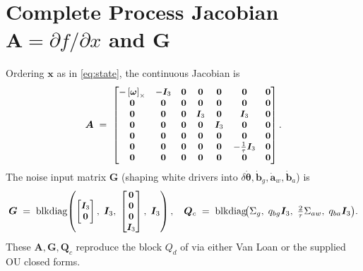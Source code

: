 \documentclass[11pt]{article}
\newcommand{\vect}[1]{\bm{#1}}
\newcommand{\mat}[1]{\bm{#1}}
\newcommand{\I}{\mat{I}}
\newcommand{\skew}[1]{\left[ #1 \right]_\times}
\begin{document}
\section{Complete Process Jacobian \texorpdfstring{$\mat{A}=\partial f/\partial x$}{A} and \texorpdfstring{$\mat{G}$}{G}}
\label{sec:AG}
Ordering \(\vect{x}\) as in \eqref{eq:state}, the continuous Jacobian is
\begin{equation}
\small
\mat{A} \;=\;
\begin{bmatrix}
 -\skew{\vect{\omega}} & -\I_3 & \mat{0} & \mat{0} & \mat{0} & \mat{0} & \mat{0} \\
 \mat{0}               & \mat{0} & \mat{0} & \mat{0} & \mat{0} & \mat{0} & \mat{0} \\
 \mat{0} & \mat{0} & \mat{0} & \I_3 & \mat{0} & \I_3 & \mat{0} \\
 \mat{0} & \mat{0} & \mat{0} & \mat{0} & \I_3 & \mat{0} & \mat{0} \\
 \mat{0} & \mat{0} & \mat{0} & \mat{0} & \mat{0} & \mat{0} & \mat{0} \\
 \mat{0} & \mat{0} & \mat{0} & \mat{0} & \mat{0} & -\tfrac{1}{\tau}\I_3 & \mat{0} \\
 \mat{0} & \mat{0} & \mat{0} & \mat{0} & \mat{0} & \mat{0} & \mat{0}
\end{bmatrix}.
\label{eq:A-ct}
\end{equation}
The noise input matrix \(\mat{G}\) (shaping white drivers into \(\delta\dot{\vect{\theta}},\dot{\vect{b}}_g,\dot{\vect{a}}_w,\dot{\vect{b}}_a\)) is
\begin{equation}
\small
\mat{G} \;=\; \mathrm{blkdiag}\!\left(
\begin{bmatrix}\I_3\\ \mat{0}\end{bmatrix},\;
\I_3,\;
\begin{bmatrix}\mat{0}\\ \mat{0}\\ \mat{0}\\ \I_3\end{bmatrix},\;
\I_3
\right),
\quad
\mat{Q}_c \;=\; \mathrm{blkdiag}\!\bigl(\Sigma_g,\; q_{bg}\I_3,\; \tfrac{2}{\tau}\Sigma_{aw},\; q_{ba}\I_3\bigr).
\label{eq:GQc}
\end{equation}
These \(\mat{A},\mat{G},\mat{Q}_c\) reproduce the block \(Q_d\) of  via
either Van Loan or the supplied OU closed forms.
\end{document}
